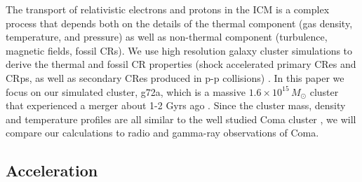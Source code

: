 \documentclass[a4paper,fleqn,usenatbib]{mnras}
\begin{document}
The transport of relativistic electrons and protons in
the ICM is a complex process that depends both on the details of the
thermal component (gas density, temperature, and pressure) as well as
non-thermal component (turbulence, magnetic fields, fossil CRs). We
use high resolution galaxy cluster simulations to derive the thermal
and fossil CR properties (shock accelerated primary CRes and CRps, as
well as secondary CRes produced in p-p collisions)
\citep{2007MNRAS.378..385P,pfrommer08,pinzke10,pinzke13}. In this
paper we focus on our simulated cluster, g72a, which is a massive
$1.6\times10^{15}\,M_\odot$ cluster that experienced a merger about
1-2 Gyrs ago \citep{2009MNRAS.399..497D}. Since the cluster mass,
density and temperature profiles are all similar to the well studied
Coma cluster \citep{2007MNRAS.378..385P,pinzke10}, we will compare our
calculations to radio and gamma-ray observations of Coma.

\subsection{Acceleration}
\end{document}

